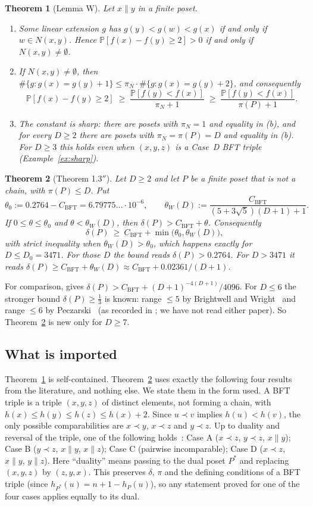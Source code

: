 \documentclass[10pt]{amsart}
\newtheorem{theorem}{Theorem}[section]
\theoremstyle{definition}
\theoremstyle{remark}
\newcommand{\PP}{\mathbb{P}}
\newcommand{\inc}{\parallel}
\newcommand{\CB}{C_{\mathrm{BFT}}}
\newcommand{\tW}{\theta_W}
\begin{document}
\begin{theorem}[Lemma W]\label{thm:W}
Let $x\inc y$ in a finite poset.
\begin{enumerate}[label=(\alph*)]
\item Some linear extension $g$ has $g(y)<g(w)<g(x)$ if and only if $w\in N(x,y)$. Hence $\PP[f(x)-f(y)\ge2]>0$ if and only if $N(x,y)\ne\emptyset$.
\item If $N(x,y)\neq\emptyset$, then $\#\{g: g(x)=g(y)+1\}\le \pi_N\cdot\#\{g:g(x)=g(y)+2\}$, and consequently
\[
\PP[f(x)-f(y)\ge 2]\;\ge\;\frac{\PP[f(y)<f(x)]}{\pi_N+1}\;\ge\;\frac{\PP[f(y)<f(x)]}{\pi(P)+1}.
\]
\item The constant is sharp: there are posets with $\pi_N=1$ and equality in (b), and for every $D\ge2$ there are posets with $\pi_N=\pi(P)=D$ and equality in (b). For $D\ge3$ this holds even when $(x,y,z)$ is a Case~D BFT triple (Example~\ref{ex:sharp}).
\end{enumerate}
\end{theorem}

\begin{theorem}[Theorem 1.3$''$]\label{thm:main}
Let $D\ge 2$ and let $P$ be a finite poset that is not a chain, with $\pi(P)\le D$. Put
\[
\theta_0:=0.2764-\CB=6.79775\ldots\cdot10^{-6},\qquad
\tW(D):=\frac{\CB}{(5+3\sqrt5)(D+1)+1}.
\]
If $0\le\theta\le\theta_0$ and $\theta<\tW(D)$, then $\delta(P)>\CB+\theta$. Consequently
\[
\delta(P)\ \ge\ \CB+\min\bigl(\theta_0,\tW(D)\bigr),
\]
with strict inequality when $\tW(D)>\theta_0$, which happens exactly for $D\le D_0=3471$. For those $D$ the bound reads $\delta(P)>0.2764$. For $D>3471$ it reads $\delta(P)\ge \CB+\tW(D)\approx \CB+0.02361/(D+1)$.
\end{theorem}

For comparison, \cite[Thm.~1.3]{KSBFT} gives $\delta(P)>\CB+(D+1)^{-4(D+1)}/4096$.
For $D\le6$ the stronger bound $\delta(P)\ge\frac13$ is known: range $\le5$ by Brightwell and Wright~\cite{BW92} and range $\le6$ by Peczarski~\cite{Pec08} (as recorded in \cite[p.~3]{KSBFT}; we have not read either paper). So Theorem~\ref{thm:main} is new only for $D\ge7$.

\subsection*{What is imported}
Theorem~\ref{thm:W} is self-contained.
Theorem~\ref{thm:main} uses exactly the following four results from the literature, and nothing else.
We state them in the form used.
A BFT triple is a triple $(x,y,z)$ of distinct elements, not forming a chain, with $h(x)\le h(y)\le h(z)\le h(x)+2$.
Since $u\prec v$ implies $h(u)<h(v)$, the only possible comparabilities are $x\prec y$, $x\prec z$ and $y\prec z$.
Up to duality and reversal of the triple, one of the following holds~\cite[\S4]{BFT95}:
Case A ($x\prec z$, $y\prec z$, $x\inc y$);
Case B ($y\prec z$, $x\inc y$, $x\inc z$);
Case C (pairwise incomparable);
Case D ($x\prec z$, $x\inc y$, $y\inc z$).
Here ``duality'' means passing to the dual poset $P^*$ and replacing $(x,y,z)$ by $(z,y,x)$. This preserves $\delta$, $\pi$ and the defining conditions of a BFT triple (since $h_{P^*}(u)=n+1-h_P(u)$), so any statement proved for one of the four cases applies equally to its dual.
\end{document}
